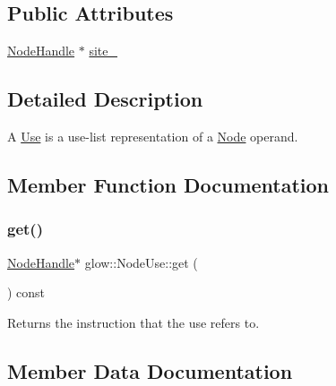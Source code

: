 \subsection*{Public Attributes}
\begin{DoxyCompactItemize}
\item 
\hyperlink{structglow_1_1_node_handle}{Node\+Handle} $\ast$ \hyperlink{structglow_1_1_node_use_a8d4fa47bff5fb0762b9f49b36d3d3323}{site\+\_\+}
\end{DoxyCompactItemize}


\subsection{Detailed Description}
A \textquotesingle{}\hyperlink{structglow_1_1_use}{Use}\textquotesingle{} is a use-\/list representation of a \hyperlink{classglow_1_1_node}{Node} operand. 

\subsection{Member Function Documentation}
\mbox{\label{structglow_1_1_node_use_aee3154b05759438b149f938279d0a93c}} 
\subsubsection{\texorpdfstring{get()}{get()}}
{\footnotesize\ttfamily \hyperlink{structglow_1_1_node_handle}{Node\+Handle}$\ast$ glow\+::\+Node\+Use\+::get (\begin{DoxyParamCaption}{ }\end{DoxyParamCaption}) const\hspace{0.3cm}{\ttfamily [inline]}}

\begin{DoxyReturn}{Returns}
the instruction that the use refers to. 
\end{DoxyReturn}


\subsection{Member Data Documentation}
\mbox{\label{structglow_1_1_node_use_a8d4fa47bff5fb0762b9f49b36d3d3323}} 
